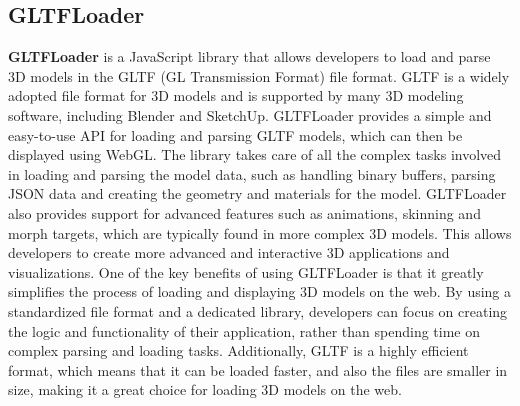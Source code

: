 \subsection{GLTFLoader}
\textbf{GLTFLoader} is a JavaScript library that allows developers to load and parse 3D models in the GLTF 
(GL Transmission Format) file format. GLTF is a widely adopted file format for 3D models and is 
supported by many 3D modeling software, including Blender and SketchUp.
GLTFLoader provides a simple and easy-to-use API for loading and parsing GLTF models, 
which can then be displayed using WebGL. The library takes care of all the complex tasks 
involved in loading and parsing the model data, such as handling binary buffers, parsing 
JSON data and creating the geometry and materials for the model.
GLTFLoader also provides support for advanced features such as animations, skinning and morph 
targets, which are typically found in more complex 3D models. This allows developers to create 
more advanced and interactive 3D applications and visualizations.
One of the key benefits of using GLTFLoader is that it greatly simplifies the process of loading and 
displaying 3D models on the web. By using a standardized file format and a dedicated library, 
developers can focus on creating the logic and functionality of their application, rather than 
spending time on complex parsing and loading tasks.
Additionally, GLTF is a highly efficient format, which means that it can be loaded faster, 
and also the files are smaller in size, making it a great choice for loading 3D models on the web. \cite{GLTFLoader}
\\
\\
